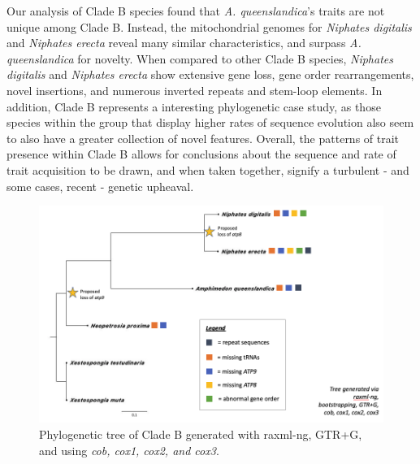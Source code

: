 \documentclass[../main.tex]{subfiles}
\begin{document}
Our analysis of Clade B species found that \emph{A. queenslandica}'s traits are not unique among Clade B. Instead, the mitochondrial genomes for \emph{Niphates digitalis} and \emph{Niphates erecta} reveal many similar characteristics, and surpass \emph{A. queenslandica} for novelty. When compared to other Clade B species, \emph{Niphates digitalis} and \emph{Niphates erecta} show extensive gene loss, gene order rearrangements, novel insertions, and numerous inverted repeats and stem-loop elements. In addition, Clade B represents a interesting phylogenetic case study, as those species within the group that display higher rates of sequence evolution also seem to also have a greater collection of novel features.  Overall, the patterns of trait presence within Clade B allows for conclusions about the sequence and rate of trait acquisition to be drawn, and when taken together, signify a turbulent - and some cases, recent - genetic upheaval.

\begin{figure}[htp]
    \centering
    \includegraphics[width=1.0\textwidth]{Figures/figure 7.png}
    \caption{Phylogenetic tree of Clade B generated with raxml-ng, GTR+G, and using \emph{cob, cox1, cox2, and cox3}.}
\end{figure}
\end{document}
